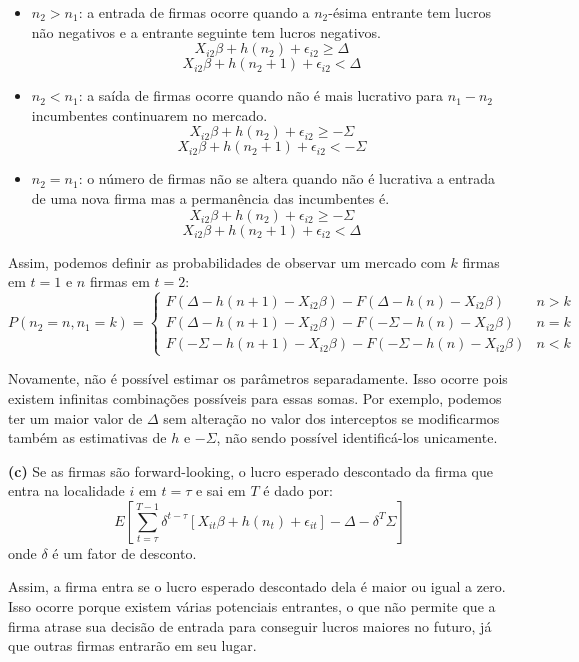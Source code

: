 \documentclass[
  12pt,
]{article}
\begin{document}
\begin{itemize}
\item
  \(n_2 > n_1\): a entrada de firmas ocorre quando a \(n_2\)-ésima
  entrante tem lucros não negativos e a entrante seguinte tem lucros
  negativos. \[
  X_{i2}\beta + h(n_2) + \epsilon_{i2} \geq \Delta
  \] \[
  X_{i2}\beta + h(n_2 + 1) + \epsilon_{i2} < \Delta
  \]
\item
  \(n_2 < n_1\): a saída de firmas ocorre quando não é mais lucrativo
  para \(n_1 - n_2\) incumbentes continuarem no mercado. \[
  X_{i2}\beta + h(n_2) + \epsilon_{i2} \geq -\Sigma
  \] \[
  X_{i2}\beta + h(n_2 + 1) + \epsilon_{i2} < -\Sigma
  \]
\item
  \(n_2 = n_1\): o número de firmas não se altera quando não é lucrativa
  a entrada de uma nova firma mas a permanência das incumbentes é. \[
  X_{i2}\beta + h(n_2) + \epsilon_{i2} \geq -\Sigma
  \] \[
  X_{i2}\beta + h(n_2 + 1) + \epsilon_{i2} < \Delta
  \]
\end{itemize}

Assim, podemos definir as probabilidades de observar um mercado com
\(k\) firmas em \(t=1\) e \(n\) firmas em \(t=2\): \[
P(n_2 = n, n_1 = k)=\left\{\begin{array}{cc}
F(\Delta - h(n + 1) - X_{i2}\beta) - F(\Delta - h(n) - X_{i2}\beta) & n > k \\
F(\Delta - h(n + 1) - X_{i2}\beta) - F(-\Sigma - h(n) - X_{i2}\beta) & n = k \\
F(-\Sigma - h(n + 1) - X_{i2}\beta) - F(-\Sigma - h(n) - X_{i2}\beta) & n < k
\end{array}\right.
\]

Novamente, não é possível estimar os parâmetros separadamente. Isso
ocorre pois existem infinitas combinações possíveis para essas somas.
Por exemplo, podemos ter um maior valor de \(\Delta\) sem alteração no
valor dos interceptos se modificarmos também as estimativas de \(h\) e
\(-\Sigma\), não sendo possível identificá-los unicamente.

\textbf{(c)} Se as firmas são forward-looking, o lucro esperado
descontado da firma que entra na localidade \(i\) em \(t=\tau\) e sai em
\(T\) é dado por: \[
E\left[\sum_{t=\tau}^{T-1} \delta^{t-\tau}[X_{it}\beta + h(n_t) + \epsilon_{it}] - \Delta - \delta^{T}\Sigma \right]
\] onde \(\delta\) é um fator de desconto.

Assim, a firma entra se o lucro esperado descontado dela é maior ou
igual a zero. Isso ocorre porque existem várias potenciais entrantes, o
que não permite que a firma atrase sua decisão de entrada para conseguir
lucros maiores no futuro, já que outras firmas entrarão em seu lugar.
\end{document}
